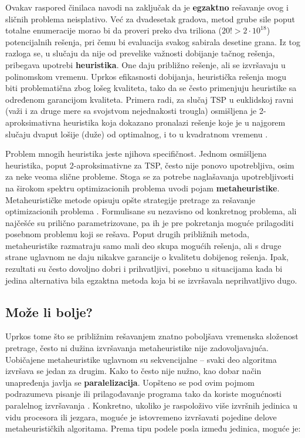 \documentclass[a4paper]{article}
\begin{document}
Ovakav raspored činilaca navodi na zaključak da je \textbf{egzaktno} rešavanje ovog i sličnih problema neisplativo. Već za dvadesetak gradova, metod grube sile poput totalne enumeracije morao bi da proveri preko dva triliona ($20! > 2\cdot10^{18}$) potencijalnih rešenja, pri čemu bi evaluacija svakog sabirala desetine grana. Iz tog razloga se, u slučaju da nije od prevelike važnosti dobijanje tačnog rešenja, pribegava upotrebi \textbf{heuristika}. One daju približno rešenje, ali se izvršavaju u polinomskom vremenu. Uprkos efikasnosti dobijanja, heuristička rešenja mogu biti problematična zbog lošeg kvaliteta, tako da se često primenjuju heuristike sa određenom garancijom kvaliteta. Primera radi, za slučaj TSP u euklidskoj ravni (važi i za druge mere sa svojstvom nejednakosti trougla) osmišljena je 2-aproksimativna heuristika \cite{ri} koja dokazano pronalazi rešenje koje je u najgorem slučaju dvaput lošije (duže) od optimalnog, i to u kvadratnom vremenu \cite{aa}.

Problem mnogih heuristika jeste njihova specifičnost. Jednom osmišljena heuristika, poput 2-aproksimativne za TSP, često nije ponovo upotrebljiva, osim za neke veoma slične probleme. Stoga se za potrebe naglašavanja upotrebljivosti na širokom spektru optimizacionih problema uvodi pojam \textbf{metaheuristike}. Metaheurističke metode opisuju opšte strategije pretrage za rešavanje optimizacionih problema \cite{vi}. Formulisane su nezavisno od konkretnog problema, ali najčešće su prilično parametrizovane, pa ih je pre pokretanja moguće prilagoditi posebnom problemu koji se rešava. Poput drugih približnih metoda, metaheuristike razmatraju samo mali deo skupa mogućih rešenja, ali s druge strane uglavnom ne daju nikakve garancije o kvalitetu dobijenog rešenja. Ipak, rezultati su često dovoljno dobri i prihvatljivi, posebno u situacijama kada bi jedina alternativa bila egzaktna metoda koja bi se izvršavala neprihvatljivo dugo.

\subsection{Može li bolje?}

Uprkos tome što se približnim rešavanjem znatno poboljšava vremenska složenost pretrage, često ni dužina izvršavanja metaheuristike nije zadovoljavajuća. Uobičajene metaheuristike uglavnom su sekvencijalne -- svaki deo algoritma izvršava se jedan za drugim. Kako to često nije nužno, kao dobar način unapređenja javlja se \textbf{paralelizacija}. Uopšteno se pod ovim pojmom podrazumeva pisanje ili prilagođavanje programa tako da koriste mogućnosti paralelnog izvršavanja \cite{rs}. Konkretno, ukoliko je raspoloživo više izvršnih jedinica u vidu procesora ili jezgara, moguće je istovremeno izvršavati pojedine delove metaheurističkih algoritama. Prema tipu podele posla između jedinica, moguće je:
\end{document}
